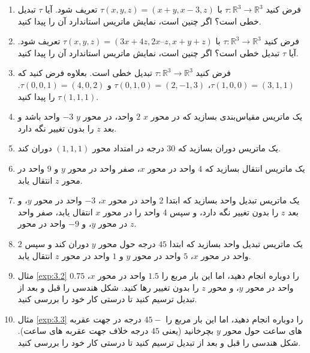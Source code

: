 {
    \Large
    \begin{spacing}{1.5}
        \begin{enumerate}[label=\textbf{\arabic*}.]
            \item {فرض کنید $\tau: \mathbb{R}^3\rightarrow\mathbb{R}^3$ با $\tau(x,y,z)=(x+y,x-3,z)$ تعریف شود.
            آیا $\tau$ تبدیل خطی است؟ اگر چنین است، نمایش ماتریس استاندارد آن را پیدا کنید.}

            \item {فرض کنید $\tau: \mathbb{R}^3\rightarrow\mathbb{R}^3$ با $\tau(x,y,z)=(3x+4z, 2x–z, x+y+z)$ تعریف شود.
            آیا $\tau$ تبدیل خطی است؟ اگر چنین است، نمایش ماتریس استاندارد آن را پیدا کنید.}

            \item {فرض کنید $\tau: \mathbb{R}^3\rightarrow\mathbb{R}^3$ تبدیل خطی است.
            بعلاوه فرض کنید که $\tau(1,0,0)=(3,1,1)$، $\tau(0,1,0)=(2,-1,3)$ و $\tau(0,0,1)=(4,0,2)$. $\tau(1,1,1)$ را پیدا کنید.}

            \item {یک ماتریس مقیاس‌بندی بسازید که در محور $x$ $2$ واحد، در محور $y$ $-3$ واحد باشد و بعد $z$ را بدون تغییر نگه دارد.}

            \item {یک ماتریس دوران بسازید که 30 درجه در امتداد محور $(1,1,1)$ دوران کند.}

            \item {یک ماتریس انتقال بسازید که $4$ واحد در محور $x$، صفر واحد در محور $y$ و $9$ واحد در محور $z$ انتقال یابد.}

            \item {یک ماتریس تبدیل واحد بسازید که ابتدا $2$ واحد در محور $x$، $-3$ واحد در محور $y$، و بعد $z$ را بدون تغییر نگه دارد، و سپس $4$ واحد را در محور $x$ انتقال یابد، صفر واحد در محور $y$، و $-9$ واحد در محور $z$.}

            \item {یک ماتریس تبدیل واحد بسازید که ابتدا $45$ درجه حول محور $y$ دوران کند و سپس $2$ واحد در محور $x$، $5$ واحد در محور $y$ و $1$ واحد در محور $z$ انتقال یابد.}

            \item {مثال \ref{exp:3.2} را دوباره انجام دهید، اما این بار مربع را $1.5$ واحد در محور $x$، $0.75$ واحد در محور $y$، و محور $z$ را بدون تغییر رها کنید.
            شکل هندسی را قبل و بعد از تبدیل ترسیم کنید تا درستی کار خود را بررسی کنید.}

            \item {مثال \ref{exp:3.3} را دوباره انجام دهید، اما این بار مربع را $45-$ درجه در جهت عقربه های ساعت حول محور $y$ بچرخانید (یعنی $45$ درجه خلاف جهت عقربه های ساعت).
            شکل هندسی را قبل و بعد از تبدیل ترسیم کنید تا درستی کار خود را بررسی کنید.}


\end{enumerate}
\end{spacing}}
